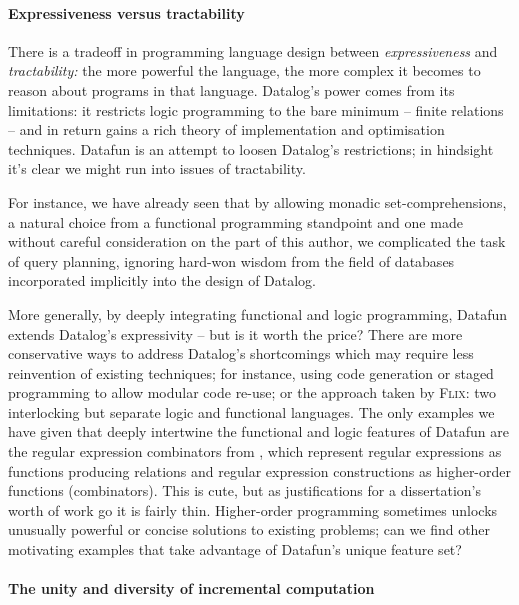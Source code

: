 \paragraph{Expressiveness versus tractability}

There is a tradeoff in programming language design between
\emph{expressiveness} and \emph{tractability:} the more powerful the language,
the more complex it becomes to reason about programs in that language.
%
Datalog's power comes from its limitations: it restricts logic programming to
the bare minimum -- finite relations -- and in return gains a rich theory of
implementation and optimisation techniques. Datafun is an attempt to loosen
Datalog's restrictions; in hindsight it's clear we might run into issues of
tractability.

For instance, we have already seen that by allowing monadic set-comprehensions, a natural choice from a functional programming standpoint and one made without careful consideration on the part of this author, we complicated the task of query planning, ignoring hard-won wisdom from the field of databases incorporated implicitly into the design of Datalog.

More generally, by deeply integrating functional and logic programming, Datafun
extends Datalog's expressivity -- but is it worth the price? There are more
conservative ways to address Datalog's shortcomings which may require less
reinvention of existing techniques; for instance, using code generation or
staged programming to allow modular code re-use; or the approach taken by
\textsc{Flix}: two interlocking but separate logic and functional languages.
%
The only examples we have given that deeply intertwine the functional and logic
features of Datafun are the regular expression combinators from
, which
represent regular expressions as functions producing relations and regular
expression constructions as higher-order functions (combinators).
%
This is cute, but as justifications for a dissertation's worth of work go it is
fairly thin.
%
Higher-order programming sometimes unlocks unusually powerful or concise
solutions to existing problems; can we find other motivating examples that take
advantage of Datafun's unique feature set?

\paragraph{The unity and diversity of incremental computation}


